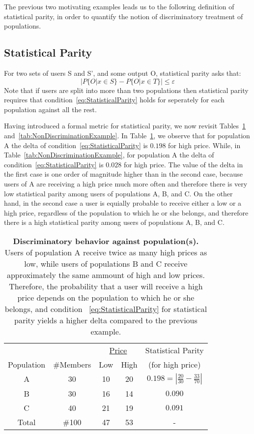 The previous two motivating examples leads us to the following definition
of statistical parity, in order to quantify the notion of discriminatory
treatment of populations.

\subsection{Statistical Parity}
For two sets of users S and S', and some output O, statistical parity
asks that:
\begin{equation}
|P\{O | x \in S\} - P\{O | x \in T\}| \le \varepsilon
\label{eq:StatisticalParity}
\end{equation}
Note that if users are split into more than two populations then statistical
parity requires that condition~\ref{eq:StatisticalParity} holds for seperately
for each population against all the rest.

Having introduced a formal metric
for statistical parity, we now revisit Tables~\ref{tab:DiscriminationExample}
and~\ref{tab:NonDiscriminationExample}. In Table~\ref{tab:DiscriminationExample},
we observe that for population A the delta of condition~\ref{eq:StatisticalParity}
is $0.198$ for high price. While, in Table~\ref{tab:NonDiscriminationExample}, for
population A the delta of condition~\ref{eq:StatisticalParity} is $0.028$ for
high price. The value of the delta in the first case is one order of magnitude
higher than in the second case, because users of A are receiving a high
price much more often and therefore there is very low statistical parity among
users of populations A, B, and C. On the other hand, in the second case a
user is equially probable to receive either a low or a high price, regardless
of the population to which he or she belongs, and therefore there is a high
statistical parity among users of populations A, B, and C.

\begin{table}[t]
{
 \scriptsize
  \renewcommand{\arraystretch}{1.5}
  \begin{tabular}{ c | c | c  c | c }
    & & \multicolumn{2}{|c|}{\underline{Price}} &  Statistical Parity\\
    Population & \#Members & Low & High & (for high price) \\
    \hline
    A & 30 &  10 & 20 & $0.198 = | \frac{20}{30} - \frac{33}{70}|$ \\
    B & 30 &  16 & 14 & $0.090$ \\
    C & 40 &  21 & 19 & $0.091$ \\
    \hline
    Total & \#100 & 47 & 53 & - \\
  \end{tabular}
  \caption{{\bf Discriminatory behavior against population(s).} Users of population A receive twice
  as many high prices as low, while users of populations B and C receive approximately the same
  ammount of high and low prices. Therefore, the probability that a user will receive a high price
  depends on the population to which he or she belongs, and condition ~\ref{eq:StatisticalParity}
  for statistical parity yields a higher delta compared to the previous example. }
  \label{tab:DiscriminationExample}
}
\end{table}

